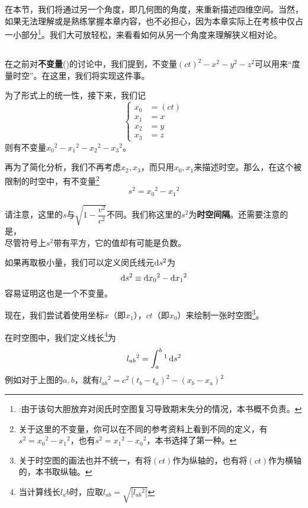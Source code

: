 \section[相对论的几何表述]{ }
在本节，我们将通过另一个角度，即几何图的角度，来重新描述四维空间。当然，如果无法理解或是熟练掌握本章内容，也不必担心，因为本章实际上在考核中仅占一小部分\footnote{\dove :由于该句大胆放弃对闵氏时空图复习导致期末失分的情况，本书概不负责。}。我们大可放轻松，来看看如何从另一个角度来理解狭义相对论。
\subsection[闵氏时空]{}
在之前对\textbf{不变量}()的讨论中，我们提到，不变量$(ct)^2-x^2-y^2-z^2$可以用来``度量时空''。在这里，我们将实现这件事。

为了形式上的统一性，接下来，我们记
\[\left\{\begin{aligned}
	x_0&=(ct)\\
	x_1&=x\\
	x_2&=y\\
	x_3&=z
\end{aligned}\right.\]
则有不变量$x_0{}^2-x_1{}^2-x_2{}^2-x_3{}^2$。

再为了简化分析，我们不再考虑$x_2,x_3$，而只用$x_0,x_1$来描述时空。那么，在这个被限制的时空中，有不变量\footnote{关于这里的不变量，你可以在不同的参考资料上看到不同的定义，有$s^2=x_0{}^2-x_1{}^2$，也有$s^2=x_1{}^2-x_0{}^2$，本书选择了第一种。}
\[s^2=x_0{}^2-x_1{}^2\]

请注意，这里的$s$与$\sqrt{1-\dfrac{v^2}{c^2}}$不同。我们称这里的$s^2$为\textbf{时空间隔}。还需要注意的是，\\[1ex]
尽管符号上$s^2$带有平方，它的值却有可能是负数。
\vspace{1ex}

如果再取极小量，我们可以定义闵氏线元$\dif s^2$为
\[\dif s^2\equiv \dif x_0{}^2-\dif x_1{}^2\]
容易证明这也是一个不变量。

现在，我们尝试着使用坐标$x$（即$x_1$），$ct$（即$x_0$）来绘制一张时空图\footnote{关于时空图的画法也并不统一，有将$(ct)$作为纵轴的，也有将$(ct)$作为横轴的，本书取纵轴。}。

在时空图中，我们定义线长\footnote{当计算线长$l_ab$时，应取$l_{ab}=\sqrt{|l_{ab}{}^2|}$}为
\[l_{ab}{}^2=\int_{a}^{b}\footnotemark \dif s^2\] 
例如对于上图的$a,b$，就有$l_{ab}{}^2=c^2(t_b-t_a)^2-(x_b-x_a)^2$


